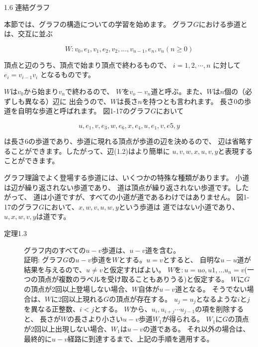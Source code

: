 
1.6 連結グラフ

本節では、グラフの構造についての学習を始めます。
グラフ$G$における歩道とは、交互に並ぶ

$$W: v_0, e_1, v_1, e_2, v_2,\dots, v_{n-1},e_n, v_n (n\geq 0)$$

頂点と辺のうち、頂点で始まり頂点で終わるもので、
$i = 1, 2,\cdots, n$ に対して $e_i = v_{i-1}v_i$ となるものです。

$W$は$v_0$から始まり$v_n$で終わるので、
$W$を$v_o-v_n$道と呼ぶ。また、$W$は$n$個の（必ずしも異なる）辺に
出会うので、$W$は長さ$n$を持つとも言われます。
長さ0の歩道を自明な歩道と呼ばれます。
図1-17のグラフ$G$において

$$u, e_1, v, e_3, w, e_6, x, e_4, u, e_1, v, e5, y$$

は長さ6の歩道であり、歩道に現れる頂点が歩道の辺を決めるので、
辺は省略することができます。したがって、辺(1.2)はより簡単に
$u, v, w, x, u, v, y$と表現することができます。

グラフ理論でよく登場する歩道には、いくつかの特殊な種類があります。
小道は辺が繰り返されない歩道であり、
道は頂点が繰り返されない歩道です。したがって、
道は小道ですが、すべての小道が道であるわけではありません。
図1-17のグラフ$G$において、$x, w, v, u, w, y$という歩道は
道ではない小道であり、$u, x, w, v, y$は道です。

\begin{description}
  \item[定理1.3] グラフ内のすべての$u-v$歩道は、$u-v$道を含む。\\
  証明: グラフ$G$の$u-v$歩道を$W$とする。$u=v$とすると、
  自明な$u-u$道が結果を与えるので、$u \neq v$と仮定すればよい。
  $Wを : u = uo, u1, ... u_n=v$(一つの頂点が複数のラベルを受け取ることもありうる)と仮定する。
  $W$に$G$の頂点が2回以上登場しない場合、$W$自体が$u-v$道となる。
  そうでない場合は、$W$に2回以上現れる$G$の頂点が存在する。
  $u_j=u_j$となるような$i$と$j$を異なる正整数、$i<j$とする。
  $W$から、$u_i, u_{i+j}\cdots u_{j-1}$の項を削除すると、
  長さが$W$の長さより小さい$u-v$歩道$W_1$が得られる。
  $W_1$に$G$の頂点が2回以上出現しない場合、$W_1$は$u-v$の道である。
  それ以外の場合は、最終的に$u-v$経路に到達するまで、上記の手順を適用する。
\end{description}